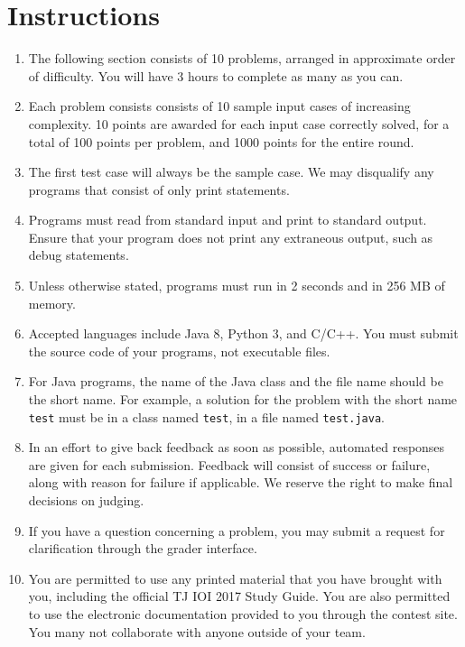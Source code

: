 \section*{Instructions}

\blank

\large
\begin{enumerate}
    \item The following section consists of 10 problems, arranged in approximate order of difficulty. You will have 3 hours to complete as many as you can.
    \item Each problem consists consists of 10 sample input cases of increasing complexity. 10 points are awarded for each input case correctly solved, for a total of 100 points per problem, and 1000 points for the entire round.
    \item The first test case will always be the sample case. We may disqualify any programs that consist of only print statements.
    \item Programs must read from standard input and print to standard output. Ensure that your program does not print any extraneous output, such as debug statements.
    \item Unless otherwise stated, programs must run in 2 seconds and in 256 MB of memory.
    \item Accepted languages include Java 8, Python 3, and C/C++. You must submit the source code of your programs, not executable files.
    \item For Java programs, the name of the Java class and the file name should be the short name. For example, a solution for the problem with the short name \verb|test| must be in a class named \verb|test|, in a file named \verb|test.java|.
    \item In an effort to give back feedback as soon as possible, automated responses are given for each submission. Feedback will consist of success or failure, along with reason for failure if applicable. We reserve the right to make final decisions on judging.
    \item If you have a question concerning a problem, you may submit a request for clarification through the grader interface.
    \item You are permitted to use any printed material that you have brought with you, including the official TJ IOI 2017 Study Guide.  You are also permitted to use the electronic documentation provided to you through the contest site. You many not collaborate with anyone outside of your team.

\end{enumerate}
